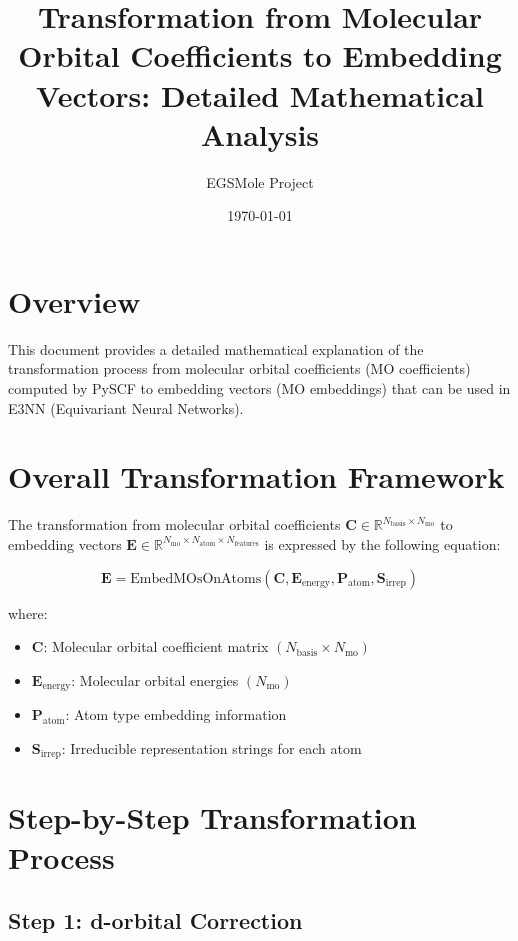 \documentclass[12pt]{article}
\title{Transformation from Molecular Orbital Coefficients to Embedding Vectors: Detailed Mathematical Analysis}
\author{EGSMole Project}
\date{\today}
\begin{document}
\maketitle

\section{Overview}

This document provides a detailed mathematical explanation of the transformation process from molecular orbital coefficients (MO coefficients) computed by PySCF to embedding vectors (MO embeddings) that can be used in E3NN (Equivariant Neural Networks).

\section{Overall Transformation Framework}

The transformation from molecular orbital coefficients $\mathbf{C} \in \mathbb{R}^{N_{\text{basis}} \times N_{\text{mo}}}$ to embedding vectors $\mathbf{E} \in \mathbb{R}^{N_{\text{mo}} \times N_{\text{atom}} \times N_{\text{features}}}$ is expressed by the following equation:

\begin{equation}
\mathbf{E} = \text{EmbedMOsOnAtoms}(\mathbf{C}, \mathbf{E}_{\text{energy}}, \mathbf{P}_{\text{atom}}, \mathbf{S}_{\text{irrep}})
\end{equation}

where:
\begin{itemize}
\item $\mathbf{C}$: Molecular orbital coefficient matrix $(N_{\text{basis}} \times N_{\text{mo}})$
\item $\mathbf{E}_{\text{energy}}$: Molecular orbital energies $(N_{\text{mo}})$
\item $\mathbf{P}_{\text{atom}}$: Atom type embedding information
\item $\mathbf{S}_{\text{irrep}}$: Irreducible representation strings for each atom
\end{itemize}

\section{Step-by-Step Transformation Process}

\subsection{Step 1: d-orbital Correction}
\end{document}
